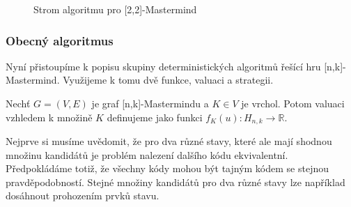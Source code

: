 \begin{figure}[h!]
    \centering
    \caption{Strom algoritmu pro [2,2]-Mastermind}
\label{fig22minmax}
\end{figure}







\subsubsection{Obecný algoritmus}
Nyní přistoupíme k popisu skupiny deterministických algoritmů řešící hru [n,k]-Mastermind. Využijeme k tomu dvě funkce, valuaci a strategii.
\begin{definice}[Valuace]
    Nechť $G = (V,E)$ je graf [n,k]-Mastermindu a $K \in V$ je vrchol. Potom valuaci vzhledem k množině $K$ definujeme jako funkci $f_K(u) \colon H_{n,k} \to \mathbb{R}$.
\end{definice}
Nejprve si musíme uvědomit, že pro dva různé stavy, které ale mají shodnou množinu kandidátů je problém nalezení dalšího kódu ekvivalentní. Předpokládáme totiž, že všechny kódy mohou být tajným kódem se stejnou pravděpodobností. Stejné množiny kandidátů pro dva různé stavy lze například dosáhnout prohozením prvků stavu. 


